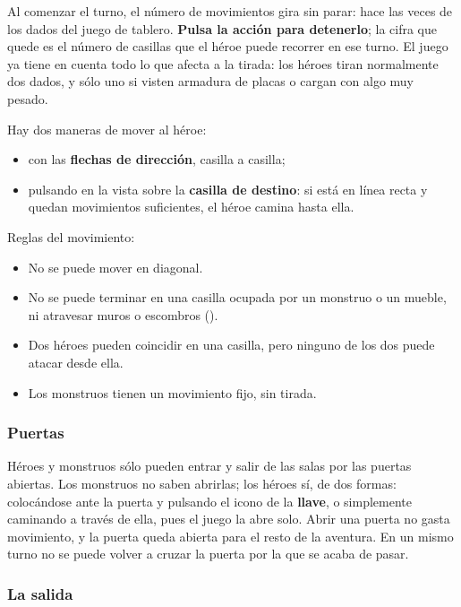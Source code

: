 Al comenzar el turno, el número de movimientos gira sin parar: hace las
veces de los dados del juego de tablero. \textbf{Pulsa la acción para
detenerlo}; la cifra que quede es el número de casillas que el héroe puede
recorrer en ese turno. El juego ya tiene en cuenta todo lo que afecta a la
tirada: los héroes tiran normalmente dos dados, y sólo uno si visten
armadura de placas o cargan con algo muy pesado.

Hay dos maneras de mover al héroe:

\begin{itemize}
\item con las \textbf{flechas de dirección}, casilla a casilla;
\item pulsando en la vista sobre la \textbf{casilla de destino}: si está en
  línea recta y quedan movimientos suficientes, el héroe camina hasta ella.
\end{itemize}

Reglas del movimiento:

\begin{itemize}
\item No se puede mover en diagonal.
\item No se puede terminar en una casilla ocupada por un monstruo o un
  mueble, ni atravesar muros o escombros ().
\item Dos héroes pueden coincidir en una casilla, pero ninguno de los dos
  puede atacar desde ella.
\item Los monstruos tienen un movimiento fijo, sin tirada.
\end{itemize}

\subsubsection*{Puertas}

Héroes y monstruos sólo pueden entrar y salir de las salas por las puertas
abiertas. Los monstruos no saben abrirlas; los héroes sí, de dos formas:
colocándose ante la puerta y pulsando el icono de la \textbf{llave}, o
simplemente caminando a través de ella, pues el juego la abre solo. Abrir
una puerta no gasta movimiento, y la puerta queda abierta para el resto de
la aventura. En un mismo turno no se puede volver a cruzar la puerta por la
que se acaba de pasar.

\subsubsection*{La salida}

